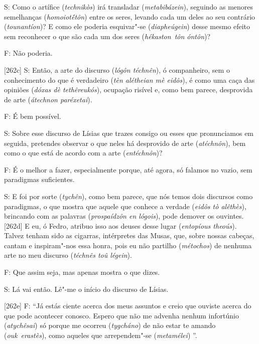  

S: Como o artífice (\emph{technikòs}) irá transladar
(\emph{metabibázein}), seguindo as menores semelhanças
(\emph{homoiotḗtôn}) entre os seres, levando cada um deles ao seu
contrário (\emph{tounantíon})? E como ele poderia esquivar"-se
(\emph{diapheúgein}) desse mesmo efeito sem reconhecer o que são cada um
dos seres (\emph{hékaston}~\emph{tôn óntôn})?

 

F: Não poderia.

 

[262c] S: Então, a arte do discurso (\emph{lógôn téchnên}), ó
companheiro, sem o conhecimento do que é verdadeiro (\emph{tèn alétheian
mè eidôs}), é como uma caça das opiniões (\emph{dóxas dè tethêreukós}),
ocupação risível e, como bem parece, desprovida de arte (\emph{átechnon
paréxetai}).

 

F: É bem possível.

 

S: Sobre esse discurso de Lísias que trazes consigo ou esses que
pronunciamos em seguida, pretendes observar o que neles há desprovido de
arte (\emph{atéchnôn}), bem como o que está de acordo com a arte
(\emph{entéchnôn})?

 

F: É o melhor a fazer, especialmente porque, até agora, só falamos no
vazio, sem paradigmas suficientes.

 

S: E foi por sorte (\emph{tychên}), como bem parece, que nós temos dois
discursos como paradigmas, o que mostra que aquele que conhece a verdade
(\emph{eidôs tò alêthès}), brincando com as palavras (\emph{prospaídzôn
en lógois}), pode demover os ouvintes. [262d] E eu, ó Fedro, atribuo
isso aos deuses desse lugar (\emph{entopíous theoús}). Talvez tenham
sido as cigarras, intérpretes das Musas, que, sobre nossas cabeças,
cantam e inspiram"-nos essa honra, pois eu não partilho (\emph{métochos})
de nenhuma arte no meu discurso (\emph{téchnês toû légein}).

 

F: Que assim seja, mas apenas mostra o que dizes.

 

S: Lá vai então. Lê"-me o início do discurso de Lísias.

 

[262e] F: ``Já estás ciente acerca dos meus assuntos e creio que
ouviste acerca do que pode acontecer conosco. Espero que não me advenha
nenhum infortúnio (\emph{atychêsai}) só porque me ocorreu
(\emph{tygcháno}) de não estar te amando (\emph{ouk}~\emph{erastès}),
como aqueles que \redondo{[…]} arrependem"-se (\emph{metamélei})
\redondo{[…]}''.

